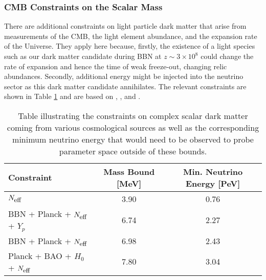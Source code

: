 \subsubsection{CMB Constraints on the Scalar Mass}\label{sec:cmbconstraints}

There are additional constraints on light particle dark matter that arise from measurements of the CMB, the light element abundance, and the expansion rate of the Universe. They apply here because, firstly, the existence of a light species such as our dark matter candidate during BBN at $z \sim 3 \times 10^8$ could change the rate of expansion and hence the time of weak freeze-out, changing relic abundances. Secondly, additional energy might be injected into the neutrino sector as this dark matter candidate annihilates. The relevant constraints are shown in Table \ref{tab:cmb} and are based on \cite{Boehm}, \cite{Nollett2015}, and \cite{Escudero2019}.

\begin{table}[t]
\centering
\begin{tabular}{lcc}
\toprule \textbf{Constraint} & \textbf{Mass Bound [MeV]} & \textbf{Min. Neutrino Energy [PeV]} \\
\midrule 
$N_{\textrm{\small eff}}$ \cite{Boehm} & 3.90 & 0.76 \\
BBN + Planck + $N_{\textrm{\small eff}}$ + $Y_p$ \cite{Nollett2015} & 6.74 & 2.27 \\
BBN + Planck + $N_{\textrm{\small eff}}$ \cite{Nollett2015} & 6.98 & 2.43 \\
Planck + BAO + $H_0$ + $N_{\textrm{\small eff}}$ \cite{Escudero2019} & 7.80 & 3.04 \\
\bottomrule
\end{tabular}
\caption{Table illustrating the constraints on complex scalar dark matter coming from various cosmological sources as well as the corresponding minimum neutrino energy that would need to be observed to probe parameter space outside of these bounds.}
\label{tab:cmb}
\end{table}

